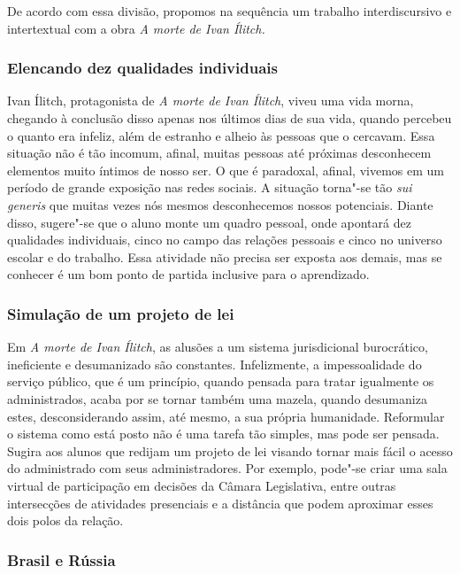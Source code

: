 \documentclass[12pt]{extarticle}
\begin{document}
De acordo com essa divisão, propomos na sequência um trabalho
interdiscursivo e intertextual com a obra \emph{A morte de Ivan Ílitch.}

\subsubsection{Elencando dez qualidades individuais}

Ivan Ílitch, protagonista de \emph{A morte de Ivan Ílitch}, viveu uma
vida morna, chegando à conclusão disso apenas nos últimos dias de sua
vida, quando percebeu o quanto era infeliz, além de estranho e alheio
às pessoas que o cercavam. Essa situação não é tão incomum, afinal,
muitas pessoas até próximas desconhecem elementos muito íntimos de
nosso ser. O que é paradoxal, afinal, vivemos em um período de grande
exposição nas redes sociais. A situação torna"-se tão \emph{sui
generis} que muitas vezes nós mesmos desconhecemos nossos potenciais.
Diante disso, sugere"-se que o aluno monte um quadro pessoal, onde
apontará dez qualidades individuais, cinco no campo das relações
pessoais e cinco no universo escolar e do trabalho. Essa atividade não
precisa ser exposta aos demais, mas se conhecer é um bom ponto de
partida inclusive para o aprendizado.

\subsubsection{Simulação de um projeto de lei}

Em \emph{A morte de Ivan Ílitch}, as alusões a um sistema
jurisdicional burocrático, ineficiente e desumanizado são
constantes. Infelizmente, a impessoalidade do serviço público, que é
um princípio, quando pensada para tratar igualmente os
administrados, acaba por se tornar também uma mazela, quando
desumaniza estes, desconsiderando assim, até mesmo, a sua própria
humanidade. Reformular o sistema como está posto não é uma tarefa tão 
simples, mas pode ser pensada. Sugira aos alunos que redijam um projeto de
lei visando tornar mais fácil o acesso do administrado com seus
administradores. Por exemplo, pode"-se criar uma sala virtual de
participação em decisões da Câmara Legislativa, entre outras
intersecções de atividades presenciais e a distância que podem
aproximar esses dois polos da relação.

\subsubsection{Brasil e Rússia}
\end{document}
